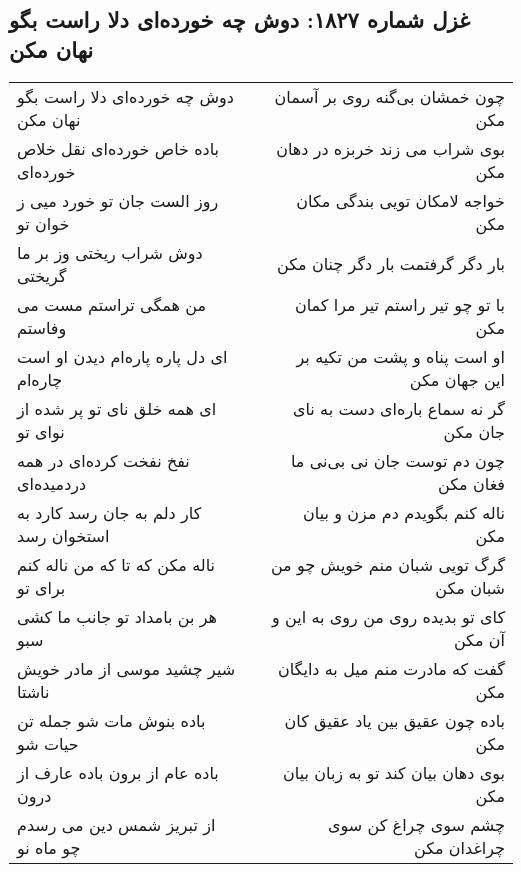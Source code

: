 \begin{center}
\section*{غزل شماره ۱۸۲۷: دوش چه خورده‌ای دلا راست بگو نهان مکن}
\label{sec:1827}
\begin{longtable}{l p{0.5cm} r}
دوش چه خورده‌ای دلا راست بگو نهان مکن
&&
چون خمشان بی‌گنه روی بر آسمان مکن
\\
باده خاص خورده‌ای نقل خلاص خورده‌ای
&&
بوی شراب می زند خربزه در دهان مکن
\\
روز الست جان تو خورد میی ز خوان تو
&&
خواجه لامکان تویی بندگی مکان مکن
\\
دوش شراب ریختی وز بر ما گریختی
&&
بار دگر گرفتمت بار دگر چنان مکن
\\
من همگی تراستم مست می وفاستم
&&
با تو چو تیر راستم تیر مرا کمان مکن
\\
ای دل پاره پاره‌ام دیدن او است چاره‌ام
&&
او است پناه و پشت من تکیه بر این جهان مکن
\\
ای همه خلق نای تو پر شده از نوای تو
&&
گر نه سماع باره‌ای دست به نای جان مکن
\\
نفخ نفخت کرده‌ای در همه دردمیده‌ای
&&
چون دم توست جان نی بی‌نی ما فغان مکن
\\
کار دلم به جان رسد کارد به استخوان رسد
&&
ناله کنم بگویدم دم مزن و بیان مکن
\\
ناله مکن که تا که من ناله کنم برای تو
&&
گرگ تویی شبان منم خویش چو من شبان مکن
\\
هر بن بامداد تو جانب ما کشی سبو
&&
کای تو بدیده روی من روی به این و آن مکن
\\
شیر چشید موسی از مادر خویش ناشتا
&&
گفت که مادرت منم میل به دایگان مکن
\\
باده بنوش مات شو جمله تن حیات شو
&&
باده چون عقیق بین یاد عقیق کان مکن
\\
باده عام از برون باده عارف از درون
&&
بوی دهان بیان کند تو به زبان بیان مکن
\\
از تبریز شمس دین می رسدم چو ماه نو
&&
چشم سوی چراغ کن سوی چراغدان مکن
\\
\end{longtable}
\end{center}
